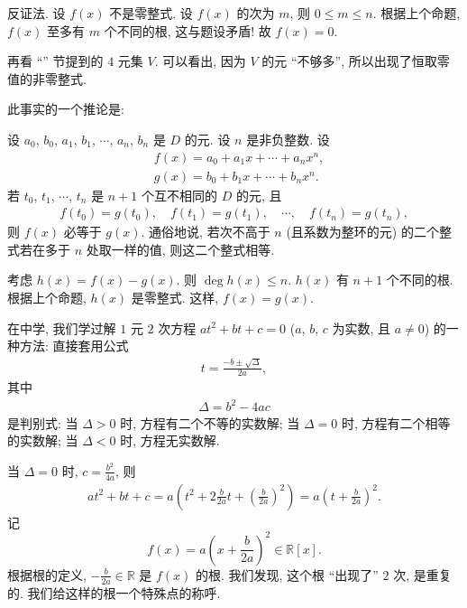 \begin{pf}
    反证法. 设 $f(x)$ 不是零整式. 设 $f(x)$ 的次为 $m$, 则 $0 \leq m \leq n$. 根据上个命题, $f(x)$ 至多有 $m$ 个不同的根, 这与题设矛盾! 故 $f(x) = 0$.
\end{pf}

\begin{remark}
    再看 ``\ValueOfAPolynomialAtAPoint'' 节提到的 $4$ 元集 $V$. 可以看出, 因为 $V$ 的元 ``不够多'', 所以出现了恒取零值的非零整式.
\end{remark}

此事实的一个推论是:

\begin{proposition}
    设 $a_0$, $b_0$, $a_1$, $b_1$, $\cdots$, $a_n$, $b_n$ 是 $D$ 的元. 设 $n$ 是非负整数. 设
    \begin{align*}
         & f(x) = a_0 + a_1 x + \cdots + a_n x^n, \\
         & g(x) = b_0 + b_1 x + \cdots + b_n x^n.
    \end{align*}
    若 $t_0$, $t_1$, $\cdots$, $t_n$ 是 $n+1$ 个互不相同的 $D$ 的元, 且
    \begin{align*}
        f(t_0) = g(t_0), \quad f(t_1) = g(t_1), \quad \cdots, \quad f(t_n) = g(t_n),
    \end{align*}
    则 $f(x)$ 必等于 $g(x)$. 通俗地说, 若次不高于 $n$ (且系数为整环的元) 的二个整式若在多于 $n$ 处取一样的值, 则这二个整式相等.
\end{proposition}

\begin{pf}
    考虑 $h(x) = f(x) - g(x)$. 则 $\deg h(x) \leq n$. $h(x)$ 有 $n+1$ 个不同的根. 根据上个命题, $h(x)$ 是零整式. 这样, $f(x) = g(x)$.
\end{pf}

在中学, 我们学过解 $1$ 元 $2$ 次方程 $at^2 + bt + c = 0$ ($a$, $b$, $c$ 为实数, 且 $a \neq 0$) 的一种方法: 直接套用公式
\begin{align*}
    t = \frac{-b \pm \sqrt{\Delta}}{2a},
\end{align*}
其中
\begin{align*}
    \Delta = b^2 - 4ac
\end{align*}
是判别式: 当 $\Delta > 0$ 时, 方程有二个不等的实数解; 当 $\Delta = 0$ 时, 方程有二个相等的实数解; 当 $\Delta < 0$ 时, 方程无实数解.

当 $\Delta = 0$ 时, $c = \frac{b^2}{4a}$, 则
\begin{align*}
    at^2 + bt + c = a \left( t^2 + 2\frac{b}{2a}t + \left(\frac{b}{2a}\right)^2 \right) = a \left( t + \frac{b}{2a} \right)^2.
\end{align*}
记
$$
    f(x) = a \left( x + \frac{b}{2a} \right)^2 \in \mathbb{R}[x].
$$
根据根的定义, $-\frac{b}{2a} \in \mathbb{R}$ 是 $f(x)$ 的根. 我们发现, 这个根 ``出现了'' $2$ 次, 是重复的. 我们给这样的根一个特殊点的称呼.

